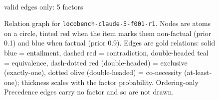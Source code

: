 \documentclass[11pt]{article}
\begin{document}
\begin{figure}[htbp]
\begin{minipage}[t]{0.48\linewidth}
{
}
\\[2pt]{\footnotesize valid edges only: 5 factors}
\end{minipage}
\caption{Relation graph for \texttt{locobench-claude-5-f001-r1}. Nodes are atoms on a circle, tinted red when the item marks them non-factual (prior 0.1) and blue when factual (prior 0.9). Edges are gold relations: solid blue = entailment, dashed red = contradiction, double-headed teal = equivalence, dash-dotted red (double-headed) = exclusive (exactly-one), dotted olive (double-headed) = co-necessity (at-least-one); thickness scales with the factor probability. Ordering-only Precedence edges carry no factor and so are not drawn.}
\label{fig:graph-locobench-claude-5-f001-r1}
\end{figure}
\end{document}
